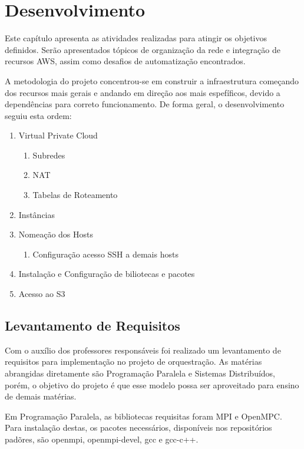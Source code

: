 \documentclass[tg]{mdtufsm}
\begin{document}
\chapter{Desenvolvimento}

Este capítulo apresenta as atividades realizadas para atingir os objetivos definidos. Serão apresentados tópicos de organização da rede e integração de recursos AWS, assim como desafios de automatização encontrados.

A metodologia do projeto concentrou-se em construir a infraestrutura começando dos recursos mais gerais e andando em direção aos mais espefíficos, devido a dependências para correto funcionamento. De forma geral, o desenvolvimento seguiu esta ordem:

\begin{enumerate}
	\item Virtual Private Cloud
	\begin{enumerate}
		\item Subredes
		\item NAT
		\item Tabelas de Roteamento
	\end{enumerate}
	\item Instâncias
	\item Nomeação dos Hosts
	\begin{enumerate}
		\item Configuração acesso SSH a demais hosts
	\end{enumerate}
	\item Instalação e Configuração de biliotecas e pacotes
	\item Acesso ao S3 
\end{enumerate}


\section{Levantamento de Requisitos}

Com o auxílio dos professores responsáveis foi realizado um levantamento de requisitos para implementação no projeto de orquestração. As matérias abrangidas diretamente são Programação Paralela e Sistemas Distribuídos, porém, o objetivo do projeto é que esse modelo possa ser aproveitado para ensino de demais matérias.

Em Programação Paralela, as bibliotecas requisitas foram MPI e OpenMPC. Para instalação destas, os pacotes necessários, disponíveis nos repositórios padõres, são openmpi, openmpi-devel, gcc e gcc-c++.
\end{document}
